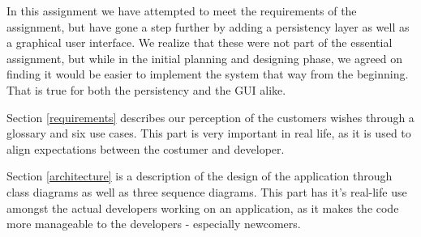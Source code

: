 In this assignment we have attempted to meet the requirements of the assignment, but have gone a step further by adding a persistency layer as well as a graphical user interface. We realize that these were not part of the essential assignment, but while in the initial planning and designing phase, we agreed on finding it would be easier to implement the system that way from the beginning. That is true for both the persistency and the GUI alike.

Section \ref{requirements} describes our perception of the customers wishes through a glossary and six use cases. This part is very important in real life, as it is used to align expectations between the costumer and developer.

Section \ref{architecture} is a description of the design of the application through class diagrams as well as three sequence diagrams. This part has it's real-life use amongst the actual developers working on an application, as it makes the code more manageable to the developers - especially newcomers.